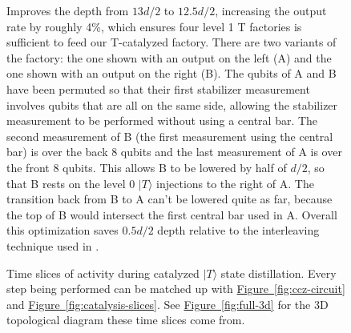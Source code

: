 \documentclass[superscriptaddress,notitlepage,longbibliography]{revtex4-1}
\newcommand{\fig}[1]{\hyperref[fig:#1]{Figure~\ref*{fig:#1}}}
\begin{document}
\begin{figure}[ht]
{        Improves the depth from $13d/2$ to $12.5d/2$, increasing the output rate by roughly 4\%, which ensures four level 1 T factories is sufficient to feed our T-catalyzed factory.
        There are two variants of the factory: the one shown with an output on the left (A) and the one shown with an output on the right (B).
        The qubits of A and B have been permuted so that their first stabilizer measurement involves qubits that are all on the same side, allowing the stabilizer measurement to be performed without using a central bar.
        The second measurement of B (the first measurement using the central bar) is over the back 8 qubits and the last measurement of A is over the front 8 qubits.
        This allows B to be lowered by half of $d/2$, so that B rests on the level 0 $|T\rangle$ injections to the right of A.
        The transition back from B to A can't be lowered quite as far, because the top of B would intersect the first central bar used in A.
        Overall this optimization saves $0.5d/2$ depth relative to the interleaving technique used in \cite{fowler2018}.
    }
\end{figure}

\begin{figure}[ht]
  \label{fig:full-slices}
  \caption{
    Time slices of activity during catalyzed $|T\rangle$ state distillation.
    Every step being performed can be matched up with \fig{ccz-circuit} and \fig{catalysis-slices}.
    See \fig{full-3d} for the 3D topological diagram these time slices come from.
  }
\end{figure}
\end{document}
